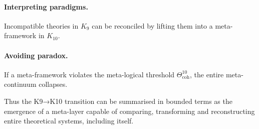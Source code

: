 \paragraph{Interpreting paradigms.}
Incompatible theories in $K_9$ can be reconciled by lifting them into a
meta-framework in $K_{10}$.

\paragraph{Avoiding paradox.}
If a meta-framework violates the meta-logical threshold
$\Theta^{10}_{\mathrm{coh}}$, the entire meta-continuum collapses.

Thus the K9→K10 transition can be summarised in bounded terms as the
emergence of a meta-layer capable of comparing, transforming and
reconstructing entire theoretical systems, including itself.
